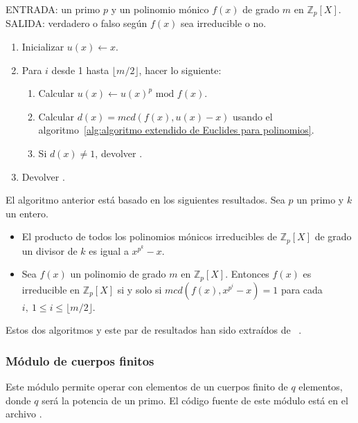\begin{algoritmo2}
    ENTRADA: un primo $p$ y un polinomio mónico $f(x)$ de grado $m$ en $\mathbb{Z}_p[X]$. \\
    SALIDA: verdadero o falso según $f(x)$ sea irreducible o no.
    \begin{enumerate}
        \item Inicializar $u(x) \leftarrow x$.
        \item Para $i$ desde 1 hasta $\lfloor m/2 \rfloor$, hacer lo siguiente:
            \begin{enumerate}
                \item Calcular $u(x) \leftarrow u(x)^p \textrm{ mod } f(x)$.
                \item Calcular $d(x) = mcd(f(x), u(x) - x)$ usando el algoritmo~\ref{alg:algoritmo extendido de Euclides para polinomios}.
                \item Si $d(x) \neq 1$, devolver .
            \end{enumerate}
        \item Devolver .
    \end{enumerate}
\end{algoritmo2}
\begin{nota}
    El algoritmo anterior está basado en los siguientes resultados. Sea $p$ un primo y $k$ un entero.
    \begin{itemize}
        \item El producto de todos los polinomios mónicos irreducibles de $\mathbb{Z}_p[X]$ de grado un divisor de $k$ es igual a $x^{p^k} - x$.
        \item Sea $f(x)$ un polinomio de grado $m$ en $\mathbb{Z}_p[X]$. Entonces $f(x)$ es irreducible en $\mathbb{Z}_p[X]$ si y solo si $mcd(f(x), x^{p^i} - x) = 1$ para cada $i, \ 1 \le i \le \lfloor m/2 \rfloor$.
    \end{itemize}
\end{nota}
Estos dos algoritmos y este par de resultados han sido extraídos de~ \cite{Menezes:1996}.

\subsubsection{Módulo de cuerpos finitos}
\label{subs:Módulo de cuerpos finitos}

Este módulo permite operar con elementos de un cuerpos finito de $q$ elementos, donde $q$ será la potencia de un primo. El código fuente de este módulo está en el archivo .

